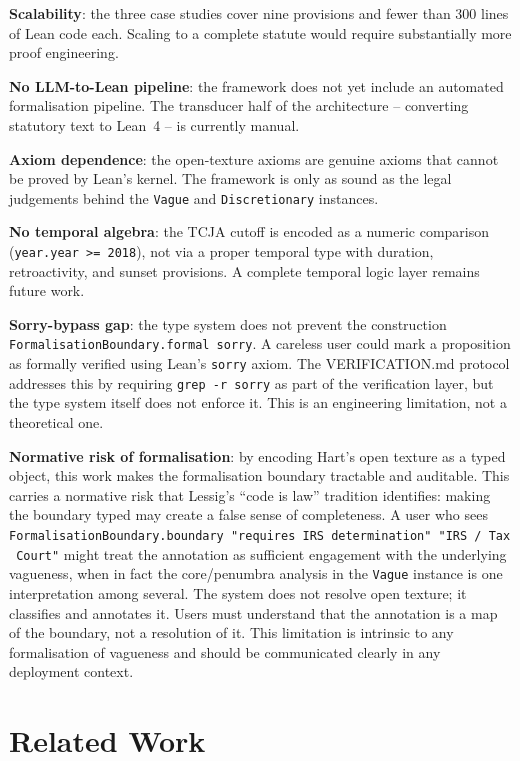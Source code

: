 \documentclass[runningheads]{llncs}
\begin{document}
\textbf{Scalability}: the three case studies cover nine provisions and fewer than
300 lines of Lean code each. Scaling to a complete statute would require
substantially more proof engineering.

\textbf{No LLM-to-Lean pipeline}: the framework does not yet include an
automated formalisation pipeline. The transducer half of the architecture --
converting statutory text to Lean~4 -- is currently manual.

\textbf{Axiom dependence}: the open-texture axioms are genuine axioms that
cannot be proved by Lean's kernel. The framework is only as sound as the legal
judgements behind the \texttt{Vague} and \texttt{Discretionary} instances.

\textbf{No temporal algebra}: the TCJA cutoff is encoded as a numeric comparison
(\texttt{year.year >= 2018}), not via a proper temporal type with duration,
retroactivity, and sunset provisions. A complete temporal logic layer remains
future work.

\textbf{Sorry-bypass gap}: the type system does not prevent the construction
\texttt{FormalisationBoundary.formal~sorry}. A careless user could mark a
proposition as formally verified using Lean's \texttt{sorry} axiom. The
VERIFICATION.md protocol addresses this by requiring
\texttt{grep~-r~sorry} as part of the verification layer, but the type system
itself does not enforce it. This is an engineering limitation, not a theoretical
one.

\textbf{Normative risk of formalisation}: by encoding Hart's open texture as a
typed object, this work makes the formalisation boundary tractable and auditable.
This carries a normative risk that Lessig's ``code is law'' tradition identifies:
making the boundary typed may create a false sense of completeness. A user who
sees \texttt{FormalisationBoundary.boundary~"requires~IRS~determination"~"IRS~/~Tax~Court"}
might treat the annotation as sufficient engagement with the underlying vagueness,
when in fact the core/penumbra analysis in the \texttt{Vague} instance is one
interpretation among several. The system does not resolve open texture; it
classifies and annotates it. Users must understand that the annotation is a map
of the boundary, not a resolution of it. This limitation is intrinsic to any
formalisation of vagueness and should be communicated clearly in any deployment
context.

\section{Related Work}
\end{document}

